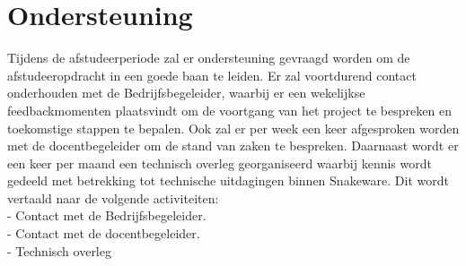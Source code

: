 \section{Ondersteuning}
Tijdens de afstudeerperiode zal er ondersteuning gevraagd worden om de afstudeeropdracht in een goede baan te leiden. 
Er zal voortdurend contact onderhouden met de Bedrijfsbegeleider, waarbij er een wekelijkse feedbackmomenten plaatsvindt om de voortgang van het project te bespreken en toekomstige stappen te bepalen.
Ook zal er per week een keer afgesproken worden met de docentbegeleider om de stand van zaken te bespreken.
Daarnaast wordt er een keer per maand een technisch overleg georganiseerd waarbij kennis wordt gedeeld met betrekking tot technische uitdagingen binnen Snakeware.
Dit wordt vertaald naar de volgende activiteiten: \\
- Contact met de Bedrijfsbegeleider. \\
- Contact met de docentbegeleider. \\
- Technisch overleg
